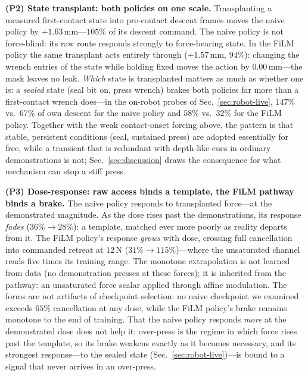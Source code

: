 \textbf{(P2) State transplant: both policies on one scale.}
\label{sec:offline-posthoc}
Transplanting a measured first-contact state into pre-contact descent frames moves the naive
policy by $+1.63$\,mm---$105\%$ of its descent command. The naive policy is not force-blind:
its raw route responds strongly to force-bearing state. In the FiLM policy the same
transplant acts entirely through \chat{} ($+1.57$\,mm, $94\%$): changing the wrench entries of
the state while holding \chat{} fixed moves the action by $0.00$\,mm---the mask leaves no
leak. \emph{Which} state is transplanted matters as
much as whether one is: a \emph{sealed} state (seal bit on, press wrench) brakes both policies
far more than a first-contact wrench does---in the on-robot probes of Sec.~\ref{sec:robot-live},
$147\%$ vs.\ $67\%$ of own descent for the naive policy and $58\%$ vs.\ $32\%$ for the
FiLM policy. Together with
the weak contact-onset forcing above, the pattern is that stable, persistent conditions (seal,
sustained press) are adopted essentially for free, while a transient that is redundant with
depth-like cues in ordinary demonstrations is not; Sec.~\ref{sec:discussion} draws the
consequence for what mechanism can stop a stiff press.

\textbf{(P3) Dose-response: raw access binds a template, the FiLM pathway binds a brake.}
The naive policy responds to transplanted force---at the demonstrated magnitude. As the dose
rises past the demonstrations, its response \emph{fades} ($36\%\rightarrow28\%$): a template,
matched ever more poorly as reality departs from it. The FiLM policy's response
\emph{grows} with dose, crossing full cancellation into commanded retreat at $12$\,N
($31\%\rightarrow115\%$)---where the unsaturated channel reads five times its training range.
The monotone extrapolation is not learned from data (no demonstration presses at these
forces); it is inherited from the pathway: an unsaturated force scalar applied through affine
modulation. The forms
are not artifacts of checkpoint selection: no naive checkpoint we examined exceeds $65\%$
cancellation at any dose, while the FiLM policy's brake remains monotone to the end of training.
That the naive policy responds \emph{more} at the demonstrated dose does not help it: over-press
is the regime in which force rises past the template, so its brake weakens exactly as it becomes
necessary, and its strongest response---to the sealed state (Sec.~\ref{sec:robot-live})---is
bound to a signal that never arrives in an over-press.

